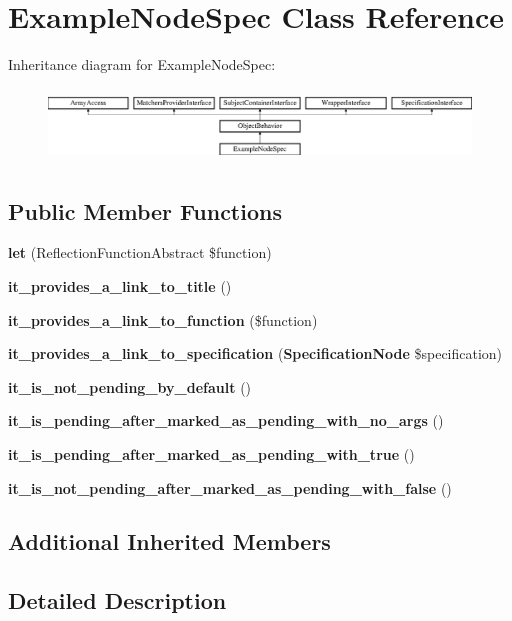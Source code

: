 \section{Example\+Node\+Spec Class Reference}
\label{classspec_1_1_php_spec_1_1_loader_1_1_node_1_1_example_node_spec}
Inheritance diagram for Example\+Node\+Spec\+:\begin{figure}[H]
\begin{center}
\leavevmode
\includegraphics[height=1.953488cm]{classspec_1_1_php_spec_1_1_loader_1_1_node_1_1_example_node_spec}
\end{center}
\end{figure}
\subsection*{Public Member Functions}
\begin{DoxyCompactItemize}
\item 
{\bf let} (Reflection\+Function\+Abstract \$function)
\item 
{\bf it\+\_\+provides\+\_\+a\+\_\+link\+\_\+to\+\_\+title} ()
\item 
{\bf it\+\_\+provides\+\_\+a\+\_\+link\+\_\+to\+\_\+function} (\$function)
\item 
{\bf it\+\_\+provides\+\_\+a\+\_\+link\+\_\+to\+\_\+specification} ({\bf Specification\+Node} \$specification)
\item 
{\bf it\+\_\+is\+\_\+not\+\_\+pending\+\_\+by\+\_\+default} ()
\item 
{\bf it\+\_\+is\+\_\+pending\+\_\+after\+\_\+marked\+\_\+as\+\_\+pending\+\_\+with\+\_\+no\+\_\+args} ()
\item 
{\bf it\+\_\+is\+\_\+pending\+\_\+after\+\_\+marked\+\_\+as\+\_\+pending\+\_\+with\+\_\+true} ()
\item 
{\bf it\+\_\+is\+\_\+not\+\_\+pending\+\_\+after\+\_\+marked\+\_\+as\+\_\+pending\+\_\+with\+\_\+false} ()
\end{DoxyCompactItemize}
\subsection*{Additional Inherited Members}


\subsection{Detailed Description}


